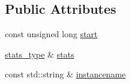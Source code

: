 \subsection*{Public Attributes}
\begin{DoxyCompactItemize}
\item 
const unsigned long \hyperlink{structecto_1_1profile_1_1stats__collector_ae607313a8ecc75d6a6ab201cdf7c2d61}{start}
\item 
\hyperlink{structecto_1_1profile_1_1stats__type}{stats\-\_\-type} \& \hyperlink{structecto_1_1profile_1_1stats__collector_a1814bc20f4bd96a974fa629249816603}{stats}
\item 
const std\-::string \& \hyperlink{structecto_1_1profile_1_1stats__collector_a8322226b54061aa2cdccd1461d7fbc4e}{instancename}
\end{DoxyCompactItemize}


